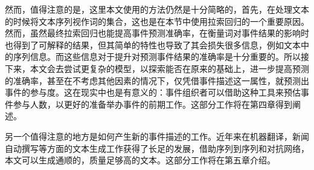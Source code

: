 然而，值得注意的是，这里本文使用的方法仍然是十分简略的，首先，在处理文本的时候将文本序列视作词的集合，这也是在本节中使用拉索回归的一个重要原因。然而，虽然最终拉索回归也能提高事件预测准确率，在衡量词对事件结果的影响时也得到了可解释的结果，但其简单的特性也导致了其会损失很多信息，例如文本中的序列信息。而这些信息对于提升对预测事件结果的准确率是十分重要的。所以接下来，本文会去尝试更复杂的模型，以探索能否在原来的基础上，进一步提高预测的准确率，甚至在不考虑其他因素的情况下，仅凭借事件描述这一属性，就预测出事件的参与度。这在现实中也是有意义的：事件组织者可以借助这种工具来预估事件参与人数，以更好的准备举办事件的前期工作。这部分工作将在第四章得到阐述。

另一个值得注意的地方是如何产生新的事件描述的工作。近年来在机器翻译，新闻自动撰写等方面的文本生成工作获得了长足的发展，借助序列到序列和对抗网络，本文可以生成通顺的，质量足够高的文本。这部分工作将在第五章介绍。

% 